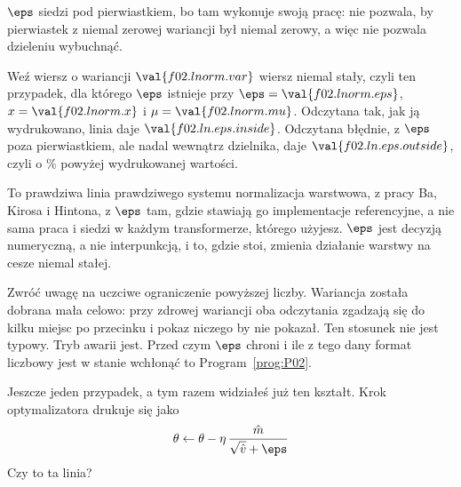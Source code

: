 \begin{fr}
$\eps$ siedzi pod pierwiastkiem, bo tam wykonuje swoją pracę: nie pozwala, by
pierwiastek z niemal zerowej wariancji był niemal zerowy, a więc nie pozwala
dzieleniu wybuchnąć.

Weź wiersz o wariancji $\val{f02.lnorm.var}$ \dash{} wiersz niemal stały, czyli
ten przypadek, dla którego $\eps$ istnieje \dash{} przy
$\eps = \val{f02.lnorm.eps}$, $x = \val{f02.lnorm.x}$ i
$\mu = \val{f02.lnorm.mu}$. Odczytana tak, jak ją wydrukowano, linia daje
$\val{f02.ln.eps.inside}$. Odczytana błędnie, z $\eps$ poza pierwiastkiem, ale
nadal wewnątrz dzielnika, daje
$\val{f02.ln.eps.outside}$, czyli o \% powyżej
wydrukowanej wartości.

\begin{aibox}
To prawdziwa linia prawdziwego systemu \dash{} normalizacja warstwowa, z pracy
Ba, Kirosa i Hintona, z $\eps$ tam, gdzie stawiają go implementacje
referencyjne, a nie sama praca \dash{} i siedzi w każdym transformerze, którego
użyjesz.
$\eps$ jest decyzją numeryczną, a nie interpunkcją, i to, gdzie stoi, zmienia
działanie warstwy na cesze niemal stałej.

Zwróć uwagę na uczciwe ograniczenie powyższej liczby. Wariancja została dobrana
mała celowo: przy zdrowej wariancji oba odczytania zgadzają się do kilku miejsc
po przecinku i pokaz niczego by nie pokazał. Ten stosunek nie jest typowy. Tryb
awarii jest. Przed czym $\eps$ chroni i ile z tego dany format liczbowy jest w
stanie wchłonąć \dash{} to Program~\ref{prog:P02}.
\end{aibox}

Jeszcze jeden przypadek, a tym razem widziałeś już ten kształt. Krok
optymalizatora drukuje się jako
\[ \theta \leftarrow \theta - \eta \, \frac{\hat{m}}{\sqrt{\hat{v}} + \eps} \]
Czy  to ta linia?
\nextframe
\end{fr}

